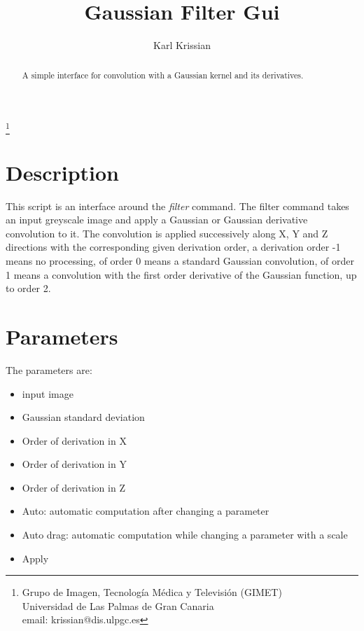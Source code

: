 \documentclass{article}
\begin{document}
\title{Gaussian Filter Gui}
\author{Karl Krissian}
\thanks{
Grupo de Imagen, Tecnolog\'ia M\'edica y Televisi\'on (GIMET)\\
Universidad de Las Palmas de Gran Canaria\\
email: krissian@dis.ulpgc.es
}


\maketitle

\begin{abstract}
A simple interface for convolution with a Gaussian kernel and its derivatives.
\end{abstract}


\section{Description}
This script is an interface around the \emph{filter} command.
The filter command takes an input greyscale image and apply a Gaussian or Gaussian derivative convolution to it.
The convolution is applied successively along X, Y and Z directions with the corresponding given derivation order, a derivation order -1 means no processing, of order 0 means a standard Gaussian convolution, of order 1 means a convolution with the first order derivative of the Gaussian function, up to order 2.

\section{Parameters}

The parameters are:
\begin{itemize}
 \item input image
 \item Gaussian standard deviation
 \item Order of derivation in X
 \item Order of derivation in Y
 \item Order of derivation in Z
 \item Auto: automatic computation after changing a parameter
 \item Auto drag: automatic computation while changing a parameter with a scale
 \item Apply
\end{itemize}
\end{document}
